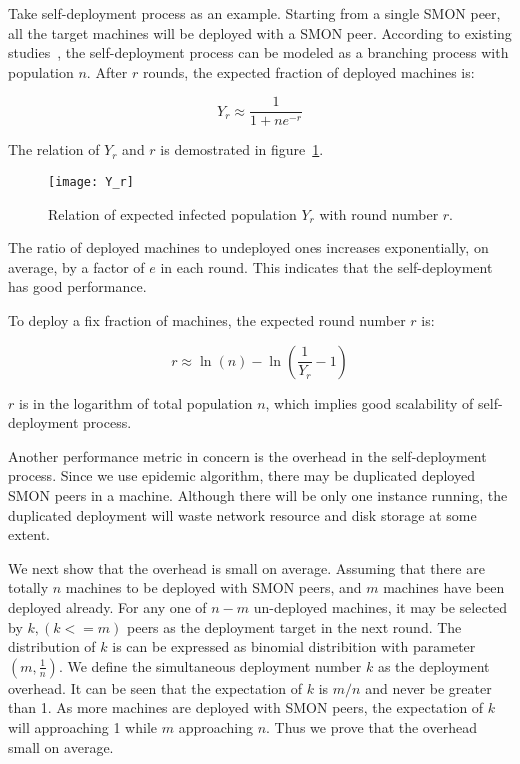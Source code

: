 Take self-deployment process as an example. Starting from a
single SMON peer, all the target machines will be deployed
with a SMON peer.  According to existing
studies~\cite{Eugster2004}, the self-deployment process can
be modeled as a branching process with population $n$. After
$r$ rounds, the expected fraction of deployed machines is:

\begin{equation*}
Y_r \approx \frac{1}{1+ne^{-r}} 
\end{equation*}

The relation of $Y_r$ and $r$ is demostrated in
figure~\ref{fig:yr}.

\begin{figure}
\centering
\texttt{[image: Y\_r]}
\caption{Relation of expected infected population $Y_r$ with
round number $r$.}
\label{fig:yr}
\end{figure}


The ratio of deployed machines to undeployed ones increases
exponentially, on average, by a factor of $e$ in each round.
This indicates that the self-deployment has good
performance.

To deploy a fix fraction of machines, the expected round
number $r$ is:

\begin{equation*}
r \approx \ln(n) - \ln(\frac{1}{Y_r} - 1)
\end{equation*}

$r$ is in the logarithm of total population $n$, which
implies good scalability of self-deployment process.


Another performance metric in concern is the overhead in
the self-deployment process. Since we use epidemic
algorithm, there may be duplicated deployed SMON peers in a
machine. Although there will be only one instance running,
the duplicated deployment will waste network resource and
disk storage at some extent.

We next show that the overhead is small on average. Assuming
that there are totally $n$ machines to be deployed with SMON
peers, and $m$ machines have been deployed already. For any
one of $n-m$ un-deployed machines, it may be selected by $k,
(k <= m)$ peers as the deployment target in the next round.
The distribution of $k$ is can be expressed as binomial
distribition with parameter $(m, \frac{1}{n})$. We define
the simultaneous deployment number $k$ as the deployment
overhead. It can be seen that the expectation of $k$ is
$m/n$ and never be greater than 1. As more machines are
deployed with SMON peers, the expectation of $k$ will
approaching 1 while $m$ approaching $n$. Thus we prove that
the overhead small on average.





